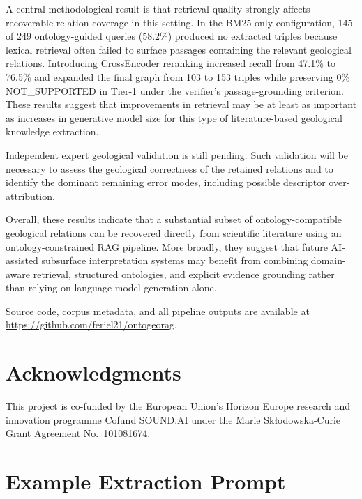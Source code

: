 \documentclass[10pt]{article}
\begin{document}
A central methodological result is that retrieval quality strongly
affects recoverable relation coverage in this setting.
In the BM25-only configuration, 145 of 249 ontology-guided queries
(58.2\%) produced no extracted triples because lexical retrieval often
failed to surface passages containing the relevant geological
relations.
Introducing CrossEncoder reranking increased recall from 47.1\% to
76.5\% and expanded the final graph from 103 to 153 triples while
preserving 0\% NOT\_SUPPORTED in Tier-1 under the verifier's passage-grounding criterion.
These results suggest that improvements in retrieval may be at least
as important as increases in generative model size for this type of
literature-based geological knowledge extraction.

Independent expert geological validation is still pending.
Such validation will be necessary to assess the geological correctness
of the retained relations and to identify the dominant remaining error
modes, including possible descriptor over-attribution.

Overall, these results indicate that a substantial subset of
ontology-compatible geological relations can be recovered directly
from scientific literature using an ontology-constrained RAG
pipeline.
More broadly, they suggest that future AI-assisted subsurface
interpretation systems may benefit from combining domain-aware
retrieval, structured ontologies, and explicit evidence grounding
rather than relying on language-model generation alone.

\medskip
\noindent Source code, corpus metadata, and all pipeline outputs
are available at \url{https://github.com/feriel21/ontogeorag}.

\section*{Acknowledgments}

This project is co-funded by the European Union's Horizon Europe
research and innovation programme Cofund SOUND.AI under the
Marie Sk\l{}odowska-Curie Grant Agreement No.~101081674.






\appendix
\section{Example Extraction Prompt}
\label{app:prompts}
\end{document}
